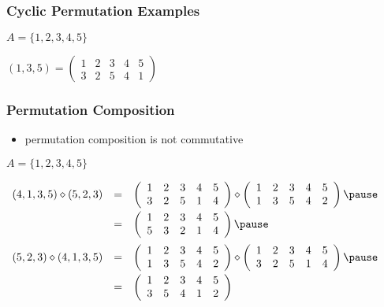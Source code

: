 \documentclass[dvipsnames]{beamer}
\begin{document}
\begin{frame}
  \frametitle{Cyclic Permutation Examples}

  \begin{example}
    $A = \{1,2,3,4,5\}$

    \medskip
    $(1,3,5) = \left(
      \begin{array}{ccccc}
        1 & 2 & 3 & 4 & 5\\
        3 & 2 & 5 & 4 & 1
      \end{array}
    \right)$
  \end{example}
\end{frame}

\begin{frame}
  \frametitle{Permutation Composition}

  \begin{itemize}
    \item permutation composition is not commutative
  \end{itemize}

  \pause
  \begin{example}
    $A = \{1,2,3,4,5\}$

    \medskip
    \small{$\begin{array}{lll}
      (4,1,3,5) \diamond (5,2,3) & = & \left(
        \begin{array}{ccccc}
          1 & 2 & 3 & 4 & 5\\
          3 & 2 & 5 & 1 & 4
        \end{array}
      \right) \diamond \left(
        \begin{array}{ccccc}
          1 & 2 & 3 & 4 & 5\\
          1 & 3 & 5 & 4 & 2
        \end{array}
      \right)\smallskip\pause\\
      & = & \left(
        \begin{array}{ccccc}
          1 & 2 & 3 & 4 & 5\\
          5 & 3 & 2 & 1 & 4
        \end{array}
      \right)\medskip\pause\\
      (5,2,3) \diamond (4,1,3,5) & = & \left(
        \begin{array}{ccccc}
          1 & 2 & 3 & 4 & 5\\
          1 & 3 & 5 & 4 & 2
        \end{array}
      \right) \diamond \left(
        \begin{array}{ccccc}
          1 & 2 & 3 & 4 & 5\\
          3 & 2 & 5 & 1 & 4
      \end{array}
    \right)\smallskip\pause\\
    & = & \left(
      \begin{array}{ccccc}
        1 & 2 & 3 & 4 & 5\\
        3 & 5 & 4 & 1 & 2
      \end{array}
    \right)
    \end{array}$}
  \end{example}
\end{frame}
\end{document}

